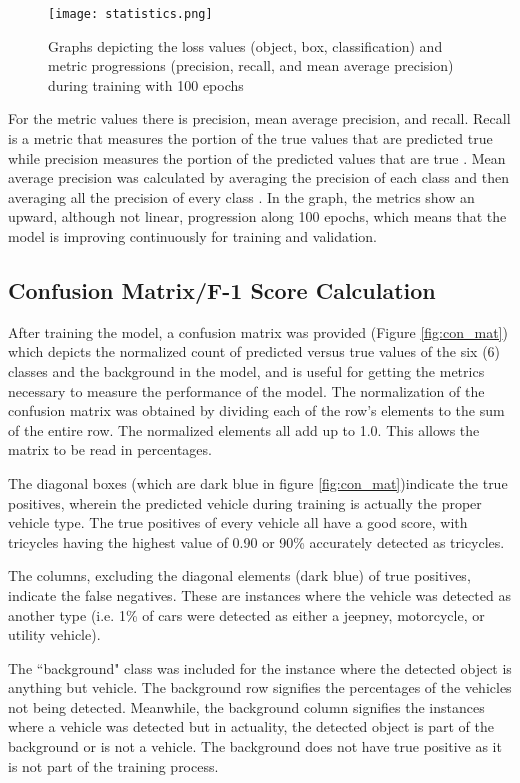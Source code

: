 \begin{figure}[!htbp]
	\texttt{[image: statistics.png]}
	\caption{Graphs depicting the loss values (object, box, classification) and metric progressions (precision, recall, and mean average precision) during training with 100 epochs}
	\label{fig:graph}
\end{figure}
\FloatBarrier

For the metric values there is precision, mean average precision, and recall. Recall is a metric that measures the portion of the true values that are predicted true while precision measures the portion of the predicted values that are true \cite{D_Powers}. Mean average precision was calculated by averaging the precision of each class and then averaging all the precision of every class \cite{Shah_2022}. In the graph, the metrics show an upward, although not linear, progression along 100 epochs, which means that the model is improving continuously for training and validation. 
 

\subsection{Confusion Matrix/F-1 Score Calculation}
After training the model, a confusion matrix was provided (Figure \ref{fig:con_mat}) which depicts the normalized count of predicted versus true values of the six (6) classes and the background in the model, and is useful for getting the metrics necessary to measure the performance of the model.
The normalization of the confusion matrix was obtained by dividing each of the row's elements to the sum of the entire row. The normalized elements all add up to 1.0. This allows the matrix to be read in percentages.

The diagonal boxes (which are dark blue in figure \ref{fig:con_mat})indicate the true positives, wherein the predicted vehicle during training is actually the proper vehicle type. The true positives of every vehicle all have a good score, with tricycles having the highest value of 0.90 or 90\% accurately detected as tricycles. 

The columns, excluding the diagonal elements (dark blue) of true positives, indicate the false negatives. These are instances where the vehicle was detected as another type (i.e. 1\% of cars were detected as either a jeepney, motorcycle, or utility vehicle).

The ``background" class was included for the instance where the detected object is anything but vehicle. The background row signifies the percentages of the vehicles not being detected. Meanwhile, the background column signifies the instances where a vehicle was detected but in actuality, the detected object is part of the background or is not a vehicle. The background does not have true positive as it is not part of the training process.


